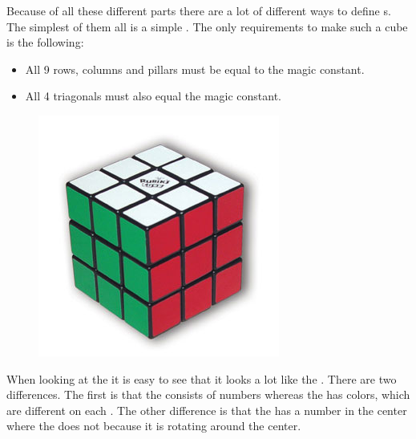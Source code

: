 Because of all these different parts there are a lot of different ways to define  \mcube{}s.
The simplest of them all is a simple  \mcube{}. The only requirements to make such a cube is the following:
\begin{itemize}
	\item All 9 rows, columns and pillars must be equal to the magic constant.
	\item All 4 triagonals must also equal the magic constant.
\end{itemize}

\begin{figure}[h]
	\centering
		\includegraphics[scale=0.4]{input/pics/rubiksCube}
	\caption{}
	\label{fig:rubiksCube}
\end{figure}

When looking at the \rubik{} it is easy to see that it looks a lot like the \mcube{}. 
There are two differences. 
The first is that the \mcube{} consists of numbers whereas the \rubik{} has colors, which are different on each \face{}.
The other difference is that the \mcube{} has a number in the center where the \rubik{} does not because it is rotating around the center. 
